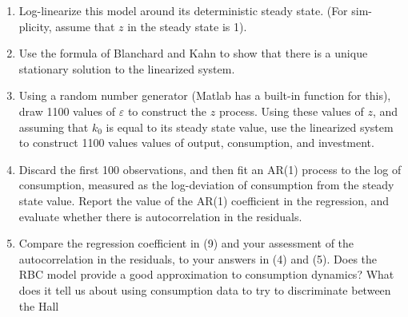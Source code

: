 \documentclass[11pt]{article}
\begin{document}
\begin{enumerate}
\newpage
\item 
 Log-linearize this model around its deterministic steady state. (For sim-
plicity, assume that $z$ in the steady state is 1).

\newpage
\item Use the formula of Blanchard and Kahn to show that there is a unique
stationary solution to the linearized system.

\newpage
\item Using a random number generator (Matlab has a built-in function for
this), draw 1100 values of $\varepsilon$ to construct the $z$ process. Using these values of $z$,
and assuming that $k_0$ is equal to its steady state value, use the linearized system
to construct 1100 values values of output, consumption, and investment.

\newpage
\item Discard the first 100 observations, and then fit an AR(1) process to the
log of consumption, measured as the log-deviation of consumption from the
steady state value. Report the value of the AR(1) coefficient in the regression,
and evaluate whether there is autocorrelation in the residuals.

\newpage
\item Compare the regression coefficient in (9) and your assessment of the
autocorrelation in the residuals, to your answers in (4) and (5). Does the RBC
model provide a good approximation to consumption dynamics? What does it
tell us about using consumption data to try to discriminate between the Hall
\end{enumerate}
\end{document}
